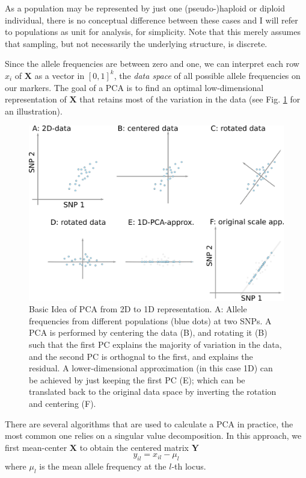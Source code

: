 \documentclass[12pt,a4pape, fullpage]{article}
\newcommand{\MX}{\mathbf{X}} %
\newcommand{\MY}{\mathbf{Y}} %
\begin{document}
As a population may be represented by just one (pseudo-)haploid or diploid individual, there is no conceptual difference between these cases and I will refer to populations as unit for analysis, for simplicity. Note that this merely assumes that sampling, but not necessarily the underlying structure, is discrete.

Since the allele frequencies are between zero and one, we can interpret each row $x_i$ of $\MX$ as a vector in $[0, 1]^k$, the \emph{data space} of all possible allele frequencies on our markers. The goal of a PCA is to find an optimal low-dimensional representation of $\MX$ that retains most of the variation in the data (see Fig. \ref{fig:pca_explanation} for an illustration). 




	
	\begin{figure}[!ht]
		\includegraphics[width=\textwidth]{pca_explanation.png}
		\caption{Basic Idea of PCA from 2D to 1D representation. A: Allele frequencies from different populations (blue dots) at two SNPs. A PCA is performed by centering the data (B), and rotating it (B) such that the first PC explains the majority of variation in the data, and the second PC is orthognal to the first, and explains the residual. A lower-dimensional approximation (in this case 1D) can be achieved by just keeping the first PC (E); which can be translated back to the original data space by inverting the rotation and centering (F).}
		\label{fig:pca_explanation}
	\end{figure}
	
	There are several algorithms that are used to calculate a PCA in practice, the most common one relies on a singular value decomposition. In this approach, we first mean-center $\MX$ to obtain the centered matrix $\MY$
	\begin{equation}
	y_{il} = x_{il} - \mu_l
	\end{equation}
	where $\mu_l$ is the mean allele frequency at the $l$-th locus.
	
\end{document}
